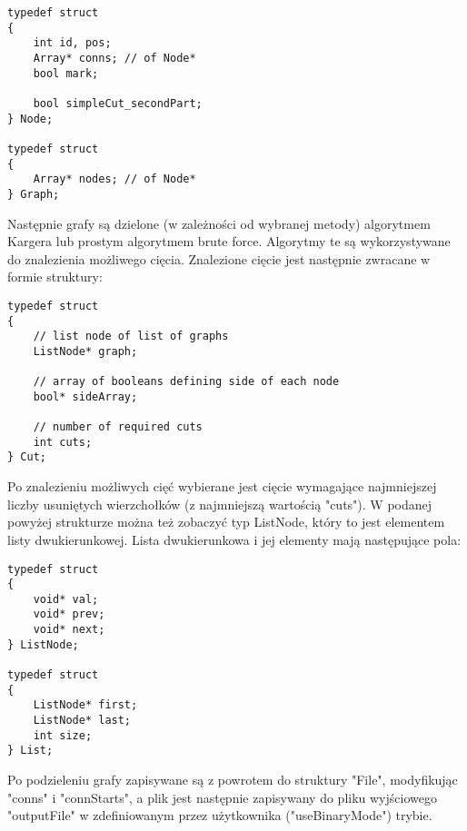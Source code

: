 \documentclass{article}
\begin{document}
\begin{verbatim}
typedef struct
{
    int id, pos;
    Array* conns; // of Node*
    bool mark;

    bool simpleCut_secondPart;
} Node;

typedef struct
{
    Array* nodes; // of Node*
} Graph;
\end{verbatim}
Następnie grafy są dzielone (w zależności od wybranej metody) algorytmem Kargera lub prostym algorytmem brute force. Algorytmy te są wykorzystywane do znalezienia możliwego cięcia. Znalezione cięcie jest następnie zwracane w formie struktury:
\begin{verbatim}
typedef struct
{
    // list node of list of graphs
    ListNode* graph;

    // array of booleans defining side of each node
    bool* sideArray;

    // number of required cuts
    int cuts;
} Cut;    
\end{verbatim}
Po znalezieniu możliwych cięć wybierane jest cięcie wymagające najmniejszej liczby usuniętych wierzchołków (z najmniejszą wartością "cuts"). W podanej powyżej strukturze można też zobaczyć typ ListNode, który to jest elementem listy dwukierunkowej. Lista dwukierunkowa i jej elementy mają następujące pola:
\begin{verbatim}
typedef struct
{
    void* val;
    void* prev;
    void* next;
} ListNode;

typedef struct
{
    ListNode* first;
    ListNode* last;
    int size;
} List;
\end{verbatim}
Po podzieleniu grafy zapisywane są z powrotem do struktury "File", modyfikując "conns" i "connStarts", a plik jest następnie zapisywany do pliku wyjściowego "outputFile" w zdefiniowanym przez użytkownika ("useBinaryMode") trybie.
\end{document}
